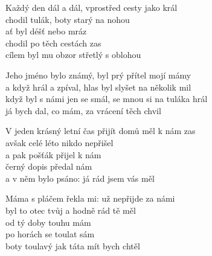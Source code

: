 
\ve{}
Každý den dál a dál, vprostřed cesty jako král\\
chodil tulák, boty starý na nohou\\
ať byl déšť nebo mráz\\
chodil po těch cestách zas\\
cílem byl mu obzor střetlý s oblohou

\cho{}
Jeho jméno bylo známý, byl prý přítel mojí mámy\\
a když hrál a zpíval, hlas byl slyšet na několik mil\\
když byl s námi jen se smál, se mnou si na tuláka hrál\\
já bych dal, co mám, za vrácení těch chvil

\ve{}
V jeden krásný letní čas přijít domů měl k nám zas\\
avšak celé léto nikdo nepřišel\\
a pak pošťák přijel k nám\\
černý dopis předal nám\\
a v něm bylo psáno: já rád jsem vás měl

\cho{}

\ve{}
Máma s pláčem řekla mi: už nepřijde za námi\\
byl to otec tvůj a hodně rád tě měl\\
od tý doby touhu mám\\
po horách se toulat sám\\
boty toulavý jak táta mít bych chtěl

\cho{}

\esong{}